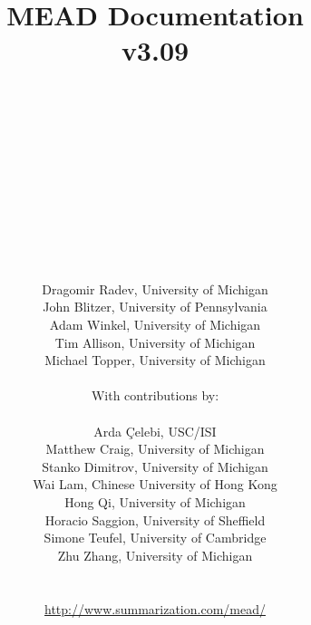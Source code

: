\documentclass[10pt]{article}
\begin{document}
 

\title{\Huge MEAD Documentation\\ v3.09}
 \author{\\ \\ \\ \\ \\ \\ \\ \\ \\ \\ \\
         Dragomir Radev, University of Michigan\\
         John Blitzer, University of Pennsylvania\\
         Adam Winkel, University of Michigan\\
         Tim Allison, University of Michigan\\
         Michael Topper, University of Michigan\\ \\
 With contributions by:\\ \\
         Arda \c{C}elebi, USC/ISI\\ 
         Matthew Craig, University of Michigan \\
	 Stanko Dimitrov, University of Michigan \\
         Wai Lam, Chinese University of Hong Kong\\ 
         Hong Qi, University of Michigan\\ 
         Horacio Saggion, University of Sheffield\\ 
         Simone Teufel, University of Cambridge\\ 
         Zhu Zhang, University of Michigan\\ \\ \\
         \url{http://www.summarization.com/mead/} \\ \\}
 \maketitle

\cleardoublepage

\tableofcontents

\cleardoublepage

\pagestyle{fancy}
\end{document}
